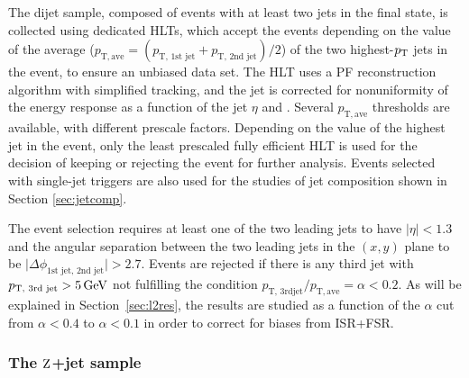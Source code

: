 \documentclass[11pt,twoside,a4paper,cmspaper,final,collab]{cms-tdr}
\begin{document}
The dijet sample, composed of events with at least two jets in the final state, is collected using
dedicated HLTs, which accept the events depending on the value of the average \pt
($p_{\mathrm{T}, \text{ave}}=(p_\text{T, 1st jet}+p_\text{T, 2nd jet})/2$) of the two highest-$p_{\mathrm{T}}$ jets in the event, to ensure an unbiased data set.
The HLT uses a PF reconstruction algorithm
with simplified tracking, and
the jet \pt is corrected for nonuniformity of the energy response as a function of the jet $\eta$ and \pt.
Several $p_{\mathrm{T}, \text{ave}}$ thresholds are available, with different prescale factors. Depending on the value of the highest jet \pt in the event,
only the least prescaled fully efficient HLT is used for the decision of keeping or rejecting the event for further analysis.
Events selected with single-jet triggers are also used for the studies of jet composition shown in Section \ref{sec:jetcomp}.

The event selection requires at least one of the two leading jets to have $ \vert \eta \vert <1.3$ and the angular separation
between the two leading jets in the $(x,y)$ plane to be $ \vert \Delta\phi_\text{1st jet, 2nd jet} \vert >2.7$.
Events are rejected if there is any third jet with $p_\text{T, 3rd jet}>5\,\text{Ge\hspace{-.08em}V}$
not fulfilling the condition $p_\text{T, 3rdjet}/p_{\mathrm{T}, \text{ave}}=\alpha<0.2$. As will be explained in Section~\ref{sec:l2res}, the
results are studied as a function of the $\alpha$ cut from $\alpha<0.4$ to $\alpha<0.1$ in order to correct for biases from ISR+FSR.

\subsubsection*{The $\mathrm{Z}$+jet sample}
\end{document}
